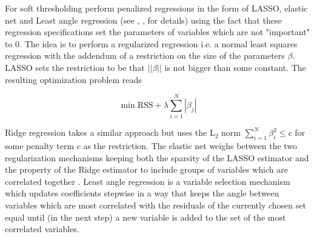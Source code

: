 \documentclass[12pt]{article}
\begin{document}
For soft thresholding \citet{bai2008forecasting} perform penalized regressions in the form of LASSO, elastic net and Least angle regression (see \citet{tibshirani1996}, \citet{zou_hastie2005}, \citet{efron_hastie_johnstone_tibshirani2004} for details) using the fact that these regression specifications set the parameters of variables which are not "important" to $0$. 
The idea is to perform a regularized regression i.e. a normal least squares regression with the addendum of a restriction on the size of the parameters $\beta$. LASSO sets the restriction to be that $||\beta||$ is not bigger than some constant. The resulting optimization problem reads

$$\min \text{RSS} + \lambda \sum_{i=1}^N |\beta_j|$$

Ridge regression takes a similar approach but uses the L$_2$ norm $\sum_{i=1}^N \beta_i^2 \leq c$ for some penalty term $c$ as the restriction. The elastic net weighs between the two regularization mechanisms keeping both the sparsity of the LASSO estimator and the property of the Ridge estimator to include groups of variables which are correlated together \citep{zou_hastie2005}. Least angle regression is a variable selection mechanism which updates coefficients stepwise in a way that keeps the angle between variables which are most correlated with the residuals of the currently chosen set equal until (in the next step) a new variable is added to the set of the most correlated variables.
\end{document}

